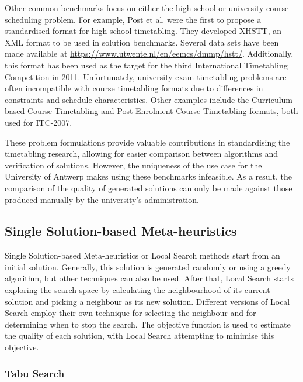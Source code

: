 Other common benchmarks focus on either the high school or university course scheduling problem. For example, Post et al. \cite{post2012} were the first to propose a standardised format for  high school timetabling. They developed XHSTT, an XML format to be used in solution benchmarks. Several data sets have been made available at \url{https://www.utwente.nl/en/eemcs/dmmp/hstt/}.
Additionally, this format has been used as the target for the third International Timetabling Competition in 2011. Unfortunately, university exam timetabling problems are often incompatible with course timetabling formats due to differences in constraints and schedule characteristics. Other examples include the Curriculum-based Course Timetabling \cite{gaspero2007} and Post-Enrolment Course Timetabling\cite{lewis2007} formats, both used for ITC-2007.

These problem formulations provide valuable contributions in standardising the timetabling research, allowing for easier comparison between algorithms and verification of solutions. However, the uniqueness of the use case for the University of Antwerp makes using these benchmarks infeasible. As a result, the comparison of the quality of generated solutions can only be made against those produced manually by the university's administration.

\subsection{Single Solution-based Meta-heuristics}

Single Solution-based Meta-heuristics or Local Search methods start from an initial solution. Generally, this solution is generated randomly or using a greedy algorithm, but other techniques can also be used. After that, Local Search starts exploring the search space by calculating the neighbourhood of its current solution and picking a neighbour as its new solution. Different versions of Local Search employ their own technique for selecting the neighbour and for determining when to stop the search. The objective function is used to estimate the quality of each solution, with Local Search attempting to minimise this objective.

\subsubsection{Tabu Search}

